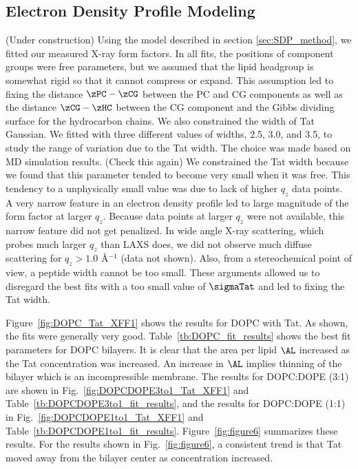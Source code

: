 \subsection{Electron Density Profile Modeling}\label{sec:SDP_results}
(Under construction)
Using the model described in section \ref{sec:SDP_method}, 
we fitted our measured X-ray form factors. In all fits,
the positions of component groups were free parameters, but we 
assumed that the lipid headgroup is somewhat rigid so that it cannot compress
or expand. This assumption led to fixing the distance
$\zPC-\zCG$ between the PC and CG components as well
as the distance $\zCG-\zHC$ between the CG component and the Gibbs dividing
surface for the hydrocarbon chains. 
We also constrained the width of Tat 
Gaussian. We fitted with three different values of widths,
2.5, 3.0, and 3.5, to study the range of variation due to the Tat width. 
The choice was made based on MD simulation results. (Check this again)
We constrained the Tat width 
because we found that this parameter tended to become very small
when it was free. This tendency to a unphysically small value was due to 
lack of higher $q_z$ data points. A very narrow feature in an electron density profile
led to large magnitude of the form factor at larger $q_z$. Because data 
points at larger $q_z$ were not available, this narrow feature did not get penalized. 
In wide angle X-ray scattering, which probes much larger $q_z$ than LAXS does,
we did not observe much diffuse scattering for $q_z > 1.0$ \AA$^{-1}$ (data not shown).
Also, from a stereochemical point of view, a peptide width cannot be too small.
These arguments allowed us to disregard the best fits with a too small value
of $\sigmaTat$ and led to fixing the Tat width.

Figure~\ref{fig:DOPC_Tat_XFF1} shows the results for DOPC with Tat. 
As shown, the fits were generally very good.  
Table~\ref{tb:DOPC_fit_results} shows the best fit parameters for DOPC bilayers.
It is clear that the area per lipid $\AL$ increased as the Tat concentration was
increased. An increase in $\AL$ implies thinning of the bilayer which is an 
incompressible membrane. The results for DOPC:DOPE (3:1) are shown in 
Fig.~\ref{fig:DOPCDOPE3to1_Tat_XFF1} and 
Table~\ref{tb:DOPCDOPE3to1_fit_results}, and the results for DOPC:DOPE (1:1) 
in Fig.~\ref{fig:DOPCDOPE1to1_Tat_XFF1} and 
Table~\ref{tb:DOPCDOPE1to1_fit_results}. Figure~\ref{fig:figure6} summarizes
these results. For the results shown in Fig.~\ref{fig:figure6}, a
consistent trend is that Tat moved away from the bilayer center as concentration increased.

